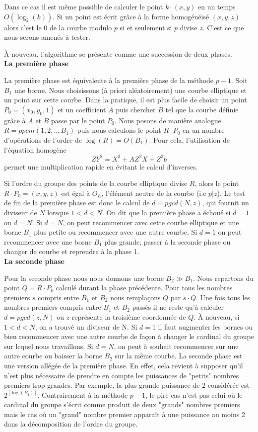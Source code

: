 \documentclass[11pt,a4paper]{article}
\begin{document}
Dans ce cas il est même possible de calculer  le point  $k \cdot(x,y)$  en un temps  $O(\log_2(k))$. Si un point est écrit grâce à la forme homogénéisé $(x,y,z)$ alors c'est le $0$ de la courbe modulo $p$ si et seulement si $p$ divise $z$. C'est ce que nous serons amenés à tester.

À nouveau, l'algorithme se présente comme une succession de deux phases. \\
	
\textbf{La première phase}
\label{mult_rapide}

La première phase est équivalente à la première phase de la méthode $p-1$. Soit $B_1$ une borne. Nous choisissons (à priori aléatoirement) une courbe elliptique et un point sur cette courbe. Dans la pratique, il est plus facile de choisir un point $P_0 =(x_0,y_0,1)$ et un coefficient $A$ puis chercher  $B$ tel que la courbe définie grâce à $A$ et $B$ passe par le point $P_0$. Nous posons de manière analogue $R = ppcm (1,2,..,B_1)$ puis nous calculons le point $R \cdot P_0 $ en un nombre d'opérations de l'ordre de $\log(R)= O(B_1)$. Pour cela, l'utilisation de l'équation homogène
\[
Z Y^2 = X^3 + A Z ^2 X + Z^3 b
\]
permet une multiplication rapide en évitant le calcul d'inverses.

Si l'ordre du groupe des points de la courbe elliptique divise $R$, alors le point $R \cdot P_0 = (x,y,z)$ est égal à $O_E$, l'élément neutre de la courbe (i.e $p | z$). Le test de fin de la première phase est donc le calcul de $d = pgcd (N,z)$, qui fournit un diviseur de $N$ lorsque $1 < d < N$. On dit que la première phase a échoué si $d = 1$ ou $d=N $. Si $d = N$, on peut recommencer avec cette courbe elliptique et une borne $B_1$ plus petite ou recommencer avec une autre courbe. Si $d=1$ on peut recommencer avec une borne $B_1$ plus grande, passer à la seconde phase ou changer de courbe et reprendre à la phase 1. \\

\textbf{La seconde phase}
	
Pour la seconde phase nous nous donnons une borne $B_2 \gg B_1$. Nous repartons du point $Q = R \cdot P_0$ calculé durant la phase précédente. Pour tous les nombres premiers $s$ compris entre $B_1$ et $B_2$ nous remplaçons $Q$ par $ s \cdot Q$. Une fois tous les nombres premiers compris entre $B_1$ et $B_2$ passés il ne reste qu'à calculer $d = pgcd(z,N)$ ou $z$ représente la troisième coordonnée de $Q$. À nouveau, si $1 < d < N$, on a trouvé un diviseur de N. Si $d = 1$ il faut augmenter les bornes ou bien recommencer avec une autre courbe de façon à changer le cardinal du groupe sur lequel nous travaillons. Si $d = N$, on peut à souhait recommencer sur une autre courbe ou baisser la borne $B_2$ sur la même courbe. La seconde phase est une version allégée de la première phase. En effet, cela revient à supposer qu'il n'est plus nécessaire de prendre en compte les puissances de "petits" nombres premiers trop grandes. Par exemple, la plus grande puissance de $2$ considérée est $2^{[\log(B_1)]}$. Contrairement à la méthode $p-1$, le pire cas n'est pas celui où le cardinal du groupe s'écrit comme produit de deux "grands" nombres premiers mais le cas où un "grand" nombre premier apparaît à une puissance au moins 2 dans la décomposition de l'ordre du groupe. 
\end{document}
